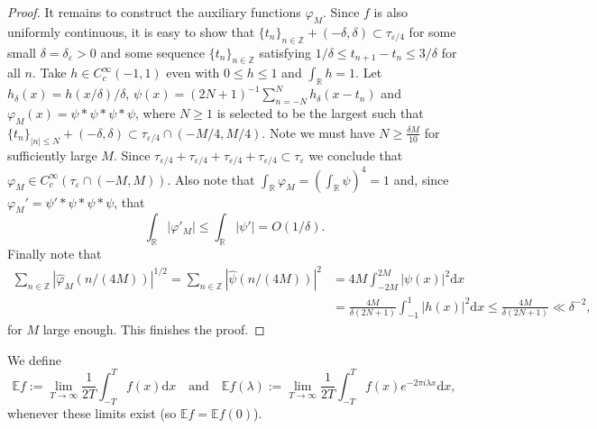 \documentclass[a4paper,reqno,12pt]{amsart}
\newcommand{\E}{\mathcal{E}}
\newcommand{\z}{\mathbb{Z}}
\renewcommand{\r}{\mathbb{R}}
\newcommand{\ft}{\widehat}
\newcommand{\la}{\lambda}
\newcommand{\ep}{\varepsilon}
\newcommand{\p}{\varphi}
\renewcommand{\d}{\mathrm{d}}
\newcommand{\1}{{\bf 1}}
\renewcommand{\E}{\mathbb{E}}
\renewcommand{\1}{{\bo 1}}
\begin{document}
\begin{proof}
It remains to construct the auxiliary functions $\p_M$. Since $f$ is also uniformly continuous, it is easy to show that $\{t_n\}_{n\in \z} + (-\delta,\delta) \subset \tau_{\ep/4}$ for some small $\delta=\delta_\ep>0$ and some sequence $\{t_n\}_{n\in \z}$ satisfying $1/\delta \leq t_{n+1}-t_n \leq 3/\delta$ for all $n$. Take $h \in C^\infty_c(-1,1)$ even with $0\leq h\leq 1$ and $\int_\r h=1$. Let $h_\delta(x)=h(x/\delta)/\delta$, $\psi(x)=(2N+1)^{-1}\sum_{n=-N}^N h_\delta(x-t_n)$ and $\p_M(x)=\psi * \psi *\psi * \psi$, where $N\geq 1$ is selected to be the largest such that $\{t_n\}_{|n|\leq N} + (-\delta,\delta) \subset \tau_{\ep/4}\cap (-M/4,M/4)$. Note we must have $N\geq \frac{\delta M}{10}$ for sufficiently large $M$. Since $\tau_{\ep/4} + \tau_{\ep/4}+\tau_{\ep/4}+\tau_{\ep/4}\subset \tau_\ep$ we conclude that $\p_M \in C^\infty_c(\tau_\ep \cap (-M,M))$. Also note that $\int_\r \p_M = (\int_\r \psi)^4 = 1$ and, since $\p_M'=\psi'*\psi*\psi *\psi$, that 
$$
\int_\r |\p'_M| \leq \int _\r|\psi'|  = O(1/\delta).
$$
Finally note that 
\begin{align*}
\sum_{n\in\z} |\ft \p_M(n/(4M))|^{1/2} = \sum_{n\in\z} |\ft \psi(n/(4M))|^{2} & = 4M \int_{-2M}^{2M}|\psi(x)|^2\d x \\ & = \frac{4M}{\delta (2N+1)} \int_{-1}^1 |h(x)|^2 \d x  \leq \frac{4M}{\delta (2N+1)}  \ll \delta^{-2},
\end{align*}
for $M$ large enough. This finishes the proof.
\end{proof}

We define
$$
\E f := \lim_{T\to\infty} \frac{1}{2T}\int_{-T}^T f(x)\d x \quad \text{and} \quad \E f(\la):=\lim_{T\to\infty} \frac{1}{2T}\int_{-T}^T f(x)e^{-2\pi i \la x}\d x,
$$
whenever these limits exist (so $\E f = \E f(0)$). 
\end{document}
